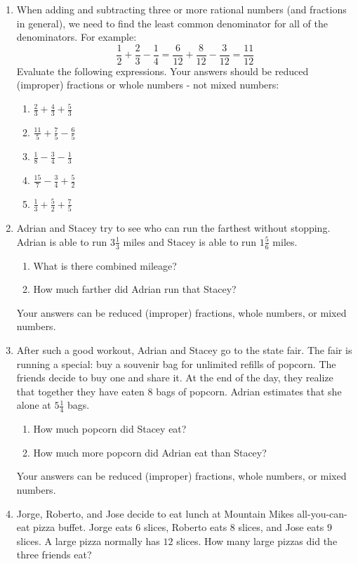 \documentclass[letterpaper,12pt,fleqn]{article}
\begin{document}
\begin{enumerate}
\item When adding and subtracting three or more rational numbers (and
  fractions in general), we need to find the least common denominator for all
  of the denominators. For example:
  \[\frac{1}{2}+\frac{2}{3}-\frac{1}{4}=\frac{6}{12}+\frac{8}{12}-\frac{3}{12}=
  \frac{11}{12}\]
  Evaluate the following expressions. Your answers should be reduced (improper)
  fractions or whole numbers - not mixed numbers:
  \begin{enumerate}
  \item $\frac{2}{3}+\frac{4}{3}+\frac{5}{3}$
  \item $\frac{11}{5}+\frac{7}{5}-\frac{6}{5}$
  \item $\frac{1}{8}-\frac{3}{4}-\frac{1}{3}$
  \item $\frac{15}{7}-\frac{3}{4}+\frac{5}{2}$
  \item $\frac{1}{3}+\frac{5}{2}+\frac{7}{5}$
  \end{enumerate}

\item Adrian and Stacey try to see who can run the farthest without stopping.
  Adrian is able to run $3\frac{1}{3}$ miles and Stacey is able to run
  $1\frac{5}{6}$ miles.
  \begin{enumerate}
  \item What is there combined mileage?
  \item How much farther did Adrian run that Stacey?
  \end{enumerate}
  Your answers can be reduced (improper) fractions, whole numbers, or mixed
  numbers.

\item After such a good workout, Adrian and Stacey go to the state fair. The
  fair is running a special: buy a souvenir bag for unlimited refills of
  popcorn. The friends decide to buy one and share it. At the end of the day,
  they realize that together they have eaten $8$ bags of popcorn. Adrian
  estimates that she alone at $5\frac{1}{4}$ bags.
  \begin{enumerate}
  \item How much popcorn did Stacey eat?
  \item How much more popcorn did Adrian eat than Stacey?
  \end{enumerate}
  Your answers can be reduced (improper) fractions, whole numbers, or mixed
  numbers.

\item Jorge, Roberto, and Jose decide to eat lunch at Mountain Mikes
  all-you-can-eat pizza buffet. Jorge eats $6$ slices, Roberto eats $8$ slices,
  and Jose eats $9$ slices. A large pizza normally has $12$ slices. How many
  large pizzas did the three friends eat?


\end{enumerate}
\end{document}
